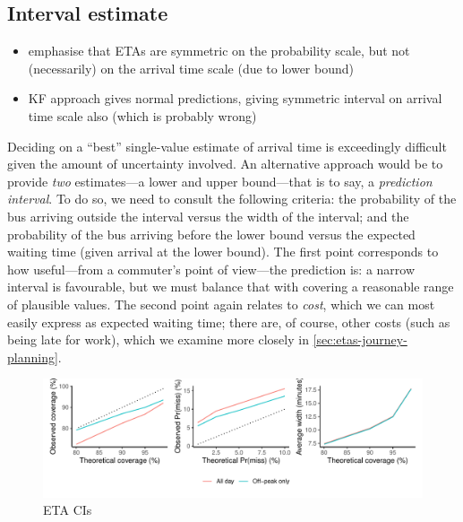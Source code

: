 \subsection{Interval estimate}
\label{sec:etas-interval}

\begin{itemize}
\item emphasise that ETAs are symmetric on the probability scale, but not (necessarily) on the arrival time scale (due to lower bound)
\item KF approach gives normal predictions, giving symmetric interval on arrival time scale also (which is probably wrong)
\end{itemize}

Deciding on a ``best'' single-value estimate of arrival time is exceedingly difficult given the amount of uncertainty involved. An alternative approach would be to provide \emph{two} estimates---a lower and upper bound---that is to say, a \emph{prediction interval}. To do so, we need to consult the following criteria:
the probability of the bus arriving outside the interval versus the width of the interval; and
the probability of the bus arriving before the lower bound versus the expected waiting time (given arrival at the lower bound).
The first point corresponds to how useful---from a commuter's point of view---the prediction is: a narrow interval is favourable, but we must balance that with covering a reasonable range of plausible values. The second point again relates to \emph{cost}, which we can most easily express as expected waiting time; there are, of course, other costs (such as being late for work), which we examine more closely in \cref{sec:etas-journey-planning}.







\begin{knitrout}\small
{}\color{fgcolor}\begin{figure}

{\centering \includegraphics[width=\textwidth]{figure/eta_cis-1} 

}

\caption[ETA CIs]{ETA CIs}\label{fig:eta_cis}
\end{figure}


\end{knitrout}


